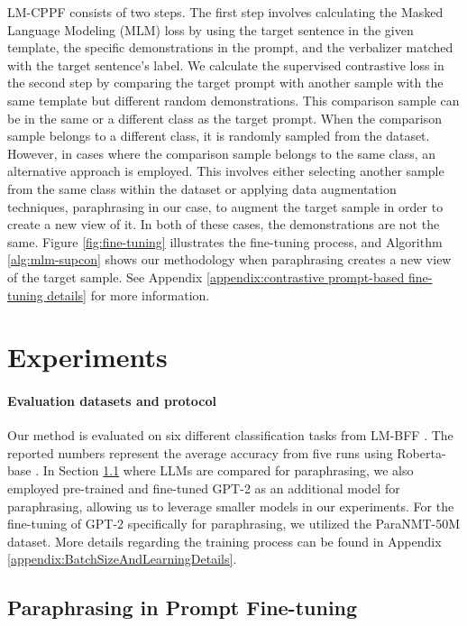 \documentclass[11pt]{article}
\begin{document}
LM-CPPF consists of two steps. The first step involves calculating the Masked Language Modeling (MLM) loss by using the target sentence in the given template, the specific demonstrations in the prompt, and the verbalizer matched with the target sentence's label. We calculate the supervised contrastive loss in the second step by comparing the target prompt with another sample with the same template but different random demonstrations. This comparison sample can be in the same or a different class as the target prompt. When the comparison sample belongs to a different class, it is randomly sampled from the dataset. However, in cases where the comparison sample belongs to the same class, an alternative approach is employed. This involves either selecting another sample from the same class within the dataset or applying data augmentation techniques, paraphrasing in our case, to augment the target sample in order to create a new view of it. In both of these cases, the demonstrations are not the same. Figure \ref{fig:fine-tuning} illustrates the fine-tuning process, and Algorithm \ref{alg:mlm-supcon} shows our methodology when paraphrasing creates a new view of the target sample. See Appendix \ref{appendix:contrastive prompt-based fine-tuning details} for more information.

\section{Experiments}
\label{sec:experiments}

\paragraph{Evaluation datasets and protocol} Our method is evaluated on six different classification tasks from LM-BFF \cite{liu2021bootstrapping}. The reported numbers represent the average accuracy from five runs using Roberta-base \cite{liu2019roberta}. In Section \ref{subsec:ParaphrasingInPromptFinetuning} where LLMs are compared for paraphrasing, we also employed pre-trained and fine-tuned GPT-2 as an additional model for paraphrasing, allowing us to leverage smaller models in our experiments. For the fine-tuning of GPT-2 specifically for paraphrasing, we utilized the ParaNMT-50M \cite{wieting-gimpel-2018-paranmt} dataset. More details regarding the training process can be found in Appendix \ref{appendix:BatchSizeAndLearningDetails}.

\subsection{Paraphrasing in Prompt Fine-tuning}
\label{subsec:ParaphrasingInPromptFinetuning}
\end{document}
